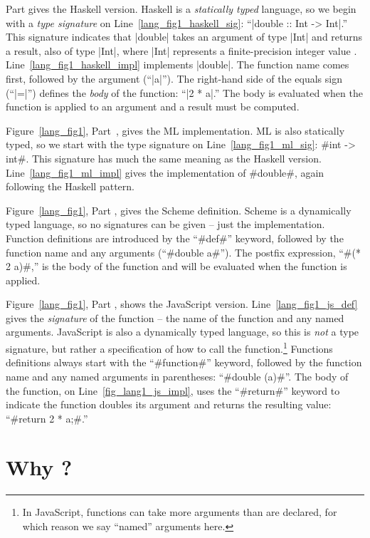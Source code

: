 \documentclass[12pt]{report}
\begin{document}
Part  gives the Haskell version. Haskell is
a \emph{statically typed} language, so we begin with a \emph{type
  signature} on Line~\ref{lang_fig1_haskell_sig}: ``|double :: Int ->
Int|.'' This signature indicates that |double| takes an argument of
type |Int| and returns a result, also of type |Int|, where |Int|
represents a finite-precision integer value
\citep{HaskellReportXX}. Line~\ref{lang_fig1_haskell_impl} implements
|double|. The function name comes first, followed by the argument
(``|a|''). The right-hand side of the equals sign (``|=|'') defines the \emph{body} of the
function: ``|2 * a|.'' The body is evaluated when the function is applied
to an argument and a result must be computed.

Figure~\ref{lang_fig1}, Part~, gives the ML
implementation. ML is also statically typed, so we start with the type
signature on Line~\ref{lang_fig1_ml_sig}: #int -> int#. This signature
has much the same meaning as the Haskell
version. Line~\ref{lang_fig1_ml_impl} gives the implementation of
#double#, again following the Haskell pattern.

Figure~\ref{lang_fig1}, Part , gives the
Scheme definition. Scheme is a dynamically typed language, so no
signatures can be given -- just the implementation. Function
definitions are introduced by the ``#def#'' keyword, followed by the
function name and any arguments (``#double a#'').  The postfix
expression, ``#(* 2 a)#,'' is the body of the function and will be
evaluated when the function is applied.

Figure~\ref{lang_fig1}, Part , shows the
JavaScript version. Line~\ref{lang_fig1_js_def} gives the
\emph{signature} of the function -- the name of the function and any
named arguments. JavaScript is also a dynamically typed language, so
this is \emph{not} a type signature, but rather a specification of how
to call the function.\footnote{In JavaScript, functions can take more
  arguments than are declared, for which reason we say ``named''
  arguments here.}  Functions definitions always start with the
``#function#'' keyword, followed by the function name and any
named arguments in parentheses: ``#double (a)#''. The body of the function,
on Line~\ref{fig_lang1_js_impl}, uses the ``#return#'' keyword to
indicate the function doubles its argument and returns the resulting
value: ``#return 2 * a;#.''


\section{Why \LamA?}
\label{lang_sec1_}
\end{document}
